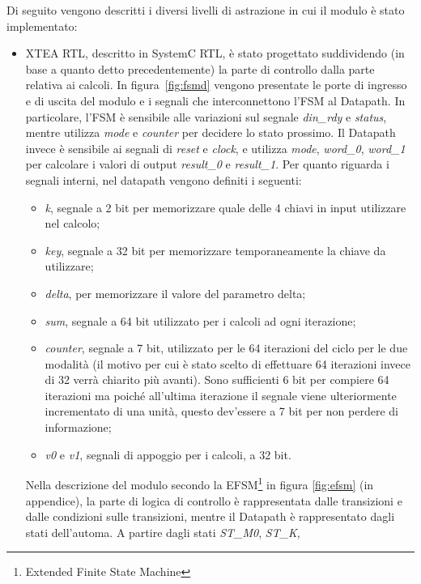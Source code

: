\documentclass[]{IEEEtran}
\newcommand{\state}[1]{\textit{#1}}
\begin{document}
Di seguito vengono descritti i diversi livelli di astrazione in cui il modulo \`e stato implementato:
\begin{itemize}
    \item XTEA RTL, descritto in SystemC RTL, \`e stato progettato suddividendo (in base a quanto detto precedentemente) 
    la parte di controllo dalla parte relativa ai calcoli. In figura~\ref{fig:fsmd} vengono presentate le porte di 
    ingresso e di uscita del modulo e i segnali che interconnettono l'FSM al Datapath. In particolare, l'FSM è sensibile
    alle variazioni sul segnale \state{din\_rdy} e \state{status}, mentre utilizza \state{mode} e \state{counter} per 
    decidere lo stato prossimo. Il Datapath invece è sensibile ai segnali di \state{reset} e \state{clock}, e utilizza 
    \state{mode}, \state{word\_0}, \state{word\_1} per calcolare i valori di output \state{result\_0} e \state{result\_1}. 
    Per quanto riguarda i segnali interni, nel datapath vengono definiti i seguenti:
    \begin{itemize}
        \item \state{k}, segnale a 2 bit per memorizzare quale delle 4 chiavi in input utilizzare nel calcolo;
        \item \state{key}, segnale a 32 bit per memorizzare temporaneamente la chiave da utilizzare;
        \item \state{delta}, per memorizzare il valore del parametro delta;
        \item \state{sum}, segnale a 64 bit utilizzato per i calcoli ad ogni iterazione;
        \item \state{counter}, segnale a 7 bit, utilizzato per le 64 iterazioni del ciclo per le due modalità (il motivo 
        per cui è stato scelto di effettuare 64 iterazioni invece di 32 verrà chiarito più avanti). Sono sufficienti 6 
        bit per compiere 64 iterazioni ma poiché all'ultima iterazione il segnale viene ulteriormente incrementato di 
        una unità, questo dev'essere a 7 bit per non perdere di informazione;
        \item \state{v0} e \state{v1}, segnali di appoggio per i calcoli, a 32 bit.
    \end{itemize}
    Nella descrizione del modulo secondo la EFSM\footnote{Extended Finite State Machine} in figura \ref{fig:efsm} (in 
    appendice), la parte di logica di controllo \`e rappresentata dalle transizioni e dalle condizioni sulle transizioni, 
    mentre il Datapath \`e rappresentato dagli stati dell'automa. A partire dagli stati \state{ST\_M0}, \state{ST\_K}, 

\end{itemize}
\end{document}
